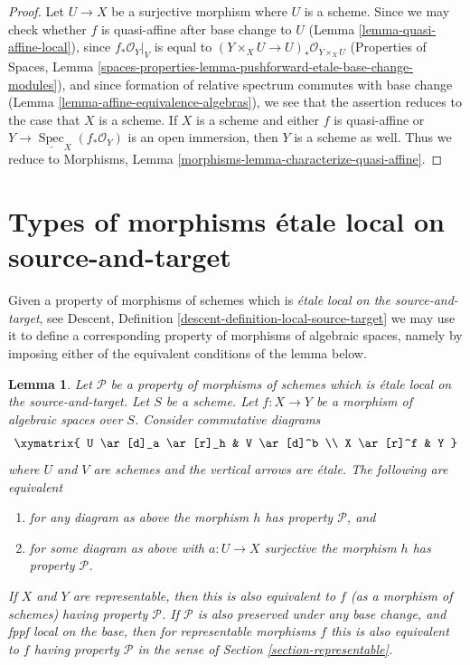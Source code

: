 \documentclass{stacks-project}
\theoremstyle{plain}
\newtheorem{lemma}[subsection]{Lemma}
\theoremstyle{definition}
\theoremstyle{remark}
\numberwithin{equation}{subsection}
\def\Spec{\mathop{\mathrm{Spec}}}
\begin{document}
\begin{proof}
Let $U \to X$ be a surjective morphism where $U$ is a scheme.
Since we may check whether $f$ is quasi-affine after base change to
$U$ (Lemma \ref{lemma-quasi-affine-local}), since $f_*\mathcal{O}_Y|_V$
is equal to $(Y \times_X U \to U)_*\mathcal{O}_{Y \times_X U}$
(Properties of Spaces, Lemma
\ref{spaces-properties-lemma-pushforward-etale-base-change-modules}), and
since formation of relative spectrum commutes with base change
(Lemma \ref{lemma-affine-equivalence-algebras}),
we see that the assertion reduces to the case that $X$ is a scheme.
If $X$ is a scheme and either $f$ is quasi-affine or
$Y \to \underline{\Spec}_X(f_*\mathcal{O}_Y)$ is an open immersion,
then $Y$ is a scheme as well. Thus we reduce to
Morphisms, Lemma \ref{morphisms-lemma-characterize-quasi-affine}.
\end{proof}







\section{Types of morphisms \'etale local on source-and-target}
\label{section-local-source-target}

\noindent
Given a property of morphisms of schemes which is {\it \'etale local on the
source-and-target}, see
Descent, Definition \ref{descent-definition-local-source-target}
we may use it to define a corresponding
property of morphisms of algebraic spaces, namely by imposing either of
the equivalent conditions of the lemma below.

\begin{lemma}
\label{lemma-local-source-target}
Let $\mathcal{P}$ be a property of morphisms of schemes
which is \'etale local on the source-and-target.
Let $S$ be a scheme.
Let $f : X \to Y$ be a morphism of algebraic spaces over $S$.
Consider commutative diagrams
$$
\xymatrix{
U \ar[d]_a \ar[r]_h & V \ar[d]^b \\
X \ar[r]^f & Y
}
$$
where $U$ and $V$ are schemes and the vertical arrows are \'etale.
The following are equivalent
\begin{enumerate}
\item for any diagram as above the morphism $h$ has property
$\mathcal{P}$, and
\item for some diagram as above with $a : U \to X$ surjective
the morphism $h$ has property $\mathcal{P}$.
\end{enumerate}
If $X$ and $Y$ are representable, then this is also equivalent to
$f$ (as a morphism of schemes) having property $\mathcal{P}$.
If $\mathcal{P}$ is also preserved under any base change, and
fppf local on the base, then for representable morphisms $f$ this
is also equivalent to $f$ having property $\mathcal{P}$ in the sense
of Section \ref{section-representable}.
\end{lemma}
\end{document}
